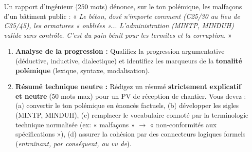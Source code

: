 \documentclass[11pt]{article}
\begin{document}
\begin{exercice}
Un rapport d'ingénieur (250 mots) dénonce, sur le ton polémique, les malfaçons d'un bâtiment public : « \textit{Le béton, dosé n'importe comment (C25/30 au lieu de C35/45), les armatures « oubliées »... L'administration (MINTP, MINDUH) valide sans contrôle. C'est du pain bénit pour les termites et la corruption.} »
\begin{enumerate}
    \item \textbf{Analyse de la progression :} Qualifiez la progression argumentative (déductive, inductive, dialectique) et identifiez les marqueurs de la \textbf{tonalité polémique} (lexique, syntaxe, modalisation).
    \item \textbf{Résumé technique neutre :} Rédigez un résumé \textbf{strictement explicatif et neutre} (50 mots max) pour un PV de réception de chantier. Vous devez : (a) convertir le ton polémique en énoncés factuels, (b) développer les sigles (MINTP, MINDUH), (c) remplacer le vocabulaire connoté par la terminologie technique normalisée (ex: « malfaçons » $\to$ « non-conformités aux spécifications »), (d) assurer la cohésion par des connecteurs logiques formels (\textit{entraînant, par conséquent, au vu de}).
\end{enumerate}
\end{exercice}
\end{document}

